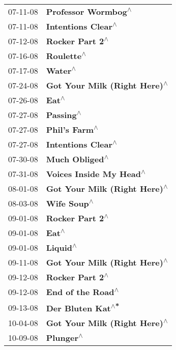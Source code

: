 \begin{supertabular}{p{0.25\columnwidth}p{0.75\columnwidth}}
 07-11-08 &           \textbf{Professor Wormbog\textsuperscript{$\wedge$}} \\
 07-11-08 &            \textbf{Intentions Clear\textsuperscript{$\wedge$}} \\
 07-12-08 &               \textbf{Rocker Part 2\textsuperscript{$\wedge$}} \\
 07-16-08 &                    \textbf{Roulette\textsuperscript{$\wedge$}} \\
 07-17-08 &                       \textbf{Water\textsuperscript{$\wedge$}} \\
 07-24-08 &  \textbf{Got Your Milk (Right Here)\textsuperscript{$\wedge$}} \\
 07-26-08 &                         \textbf{Eat\textsuperscript{$\wedge$}} \\
 07-27-08 &                     \textbf{Passing\textsuperscript{$\wedge$}} \\
 07-27-08 &                 \textbf{Phil's Farm\textsuperscript{$\wedge$}} \\
 07-27-08 &            \textbf{Intentions Clear\textsuperscript{$\wedge$}} \\
 07-30-08 &                \textbf{Much Obliged\textsuperscript{$\wedge$}} \\
 07-31-08 &       \textbf{Voices Inside My Head\textsuperscript{$\wedge$}} \\
 08-01-08 &  \textbf{Got Your Milk (Right Here)\textsuperscript{$\wedge$}} \\
 08-03-08 &                   \textbf{Wife Soup\textsuperscript{$\wedge$}} \\
 09-01-08 &               \textbf{Rocker Part 2\textsuperscript{$\wedge$}} \\
 09-01-08 &                         \textbf{Eat\textsuperscript{$\wedge$}} \\
 09-01-08 &                      \textbf{Liquid\textsuperscript{$\wedge$}} \\
 09-11-08 &  \textbf{Got Your Milk (Right Here)\textsuperscript{$\wedge$}} \\
 09-12-08 &               \textbf{Rocker Part 2\textsuperscript{$\wedge$}} \\
 09-12-08 &             \textbf{End of the Road\textsuperscript{$\wedge$}} \\
 09-13-08 &             \textbf{Der Bluten Kat\textsuperscript{$\wedge$*}} \\
 10-04-08 &  \textbf{Got Your Milk (Right Here)\textsuperscript{$\wedge$}} \\
 10-09-08 &                     \textbf{Plunger\textsuperscript{$\wedge$}} \\

\end{supertabular}
